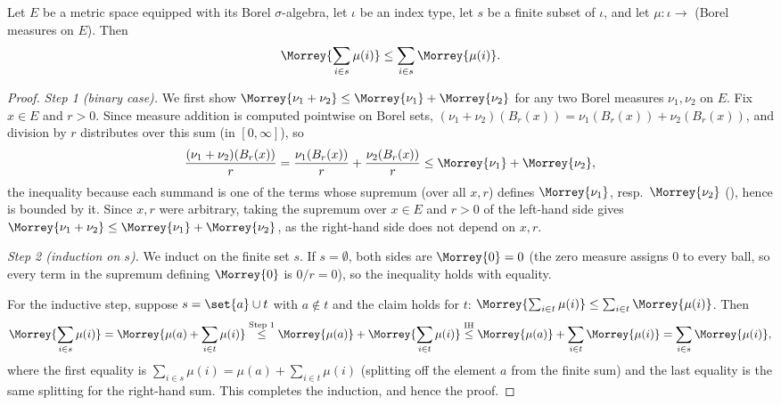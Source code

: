\begin{lemma}
  Let $E$ be a metric space equipped with its Borel $\sigma$-algebra, let $\iota$ be an index type,
  let $s$ be a finite subset of $\iota$, and let $\mu \colon \iota \to$ (Borel measures on $E$).
  Then
  \[
    \Morrey{\sum_{i \in s} \mu(i)} \le \sum_{i \in s} \Morrey{\mu(i)}
    .
  \]
\end{lemma}
\begin{proof}
  \emph{Step 1 (binary case).} We first show $\Morrey{\nu_1 + \nu_2} \le \Morrey{\nu_1} +
  \Morrey{\nu_2}$ for any two Borel measures $\nu_1, \nu_2$ on $E$. Fix $x \in E$ and $r > 0$. Since
  measure addition is computed pointwise on Borel sets, $(\nu_1+\nu_2)(B_r(x)) = \nu_1(B_r(x)) +
  \nu_2(B_r(x))$, and division by $r$ distributes over this sum (in $[0,\infty]$), so
  \[
    \frac{(\nu_1+\nu_2)(B_r(x))}{r} = \frac{\nu_1(B_r(x))}{r} + \frac{\nu_2(B_r(x))}{r}
    \le \Morrey{\nu_1} + \Morrey{\nu_2}
    ,
  \]
  the inequality because each summand is one of the terms whose supremum (over all $x,r$) defines
  $\Morrey{\nu_1}$, resp.\ $\Morrey{\nu_2}$ (), hence is bounded by it. Since
  $x,r$ were arbitrary, taking the supremum over $x \in E$ and $r>0$ of the left-hand side gives
  $\Morrey{\nu_1+\nu_2} \le \Morrey{\nu_1}+\Morrey{\nu_2}$, as the right-hand side does not depend
  on $x,r$.

  \emph{Step 2 (induction on $s$).} We induct on the finite set $s$. If $s = \emptyset$, both sides
  are $\Morrey{0} = 0$ (the zero measure assigns $0$ to every ball, so every term in the supremum
  defining $\Morrey{0}$ is $0/r = 0$), so the inequality holds with equality.

  For the inductive step, suppose $s = \set{a} \cup t$ with $a \notin t$ and the claim holds for
  $t$: $\Morrey{\sum_{i\in t}\mu(i)} \le \sum_{i\in t}\Morrey{\mu(i)}$. Then
  \[
    \Morrey{\sum_{i \in s} \mu(i)}
    = \Morrey{\mu(a) + \sum_{i \in t} \mu(i)}
    \overset{\text{Step 1}}{\le} \Morrey{\mu(a)} + \Morrey{\sum_{i\in t}\mu(i)}
    \overset{\text{IH}}{\le} \Morrey{\mu(a)} + \sum_{i \in t} \Morrey{\mu(i)}
    = \sum_{i \in s} \Morrey{\mu(i)}
    ,
  \]
  where the first equality is $\sum_{i\in s}\mu(i) = \mu(a) + \sum_{i\in t}\mu(i)$ (splitting off
  the element $a$ from the finite sum) and the last equality is the same splitting for the
  right-hand sum. This completes the induction, and hence the proof.
\end{proof}

